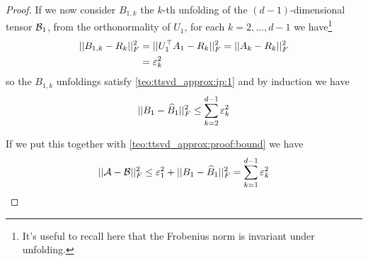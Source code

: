 \begin{Teo}
\begin{proof}
    If we now consider $B_{1,k}$ the $k$-th unfolding of the $(d-1)$-dimensional tensor $\mathcal{B}_1$, from the orthonormality of $U_1$, for each $k=2,\ldots,d-1$ we have\footnote{It's useful to recall here that the Frobenius norm is invariant under unfolding.}
    \begin{equation*}
      \begin{split}
        ||B_{1,k} - R_k||_F^2 &= ||U_1^\top A_1 - R_k||_F^2 = ||A_k - R_k||_F^2\\
         &= \varepsilon_k^2
      \end{split}
    \end{equation*}
    so the $B_{1,k}$ unfoldings satisfy \ref{teo:ttsvd_approx:ip:1} and by induction we have
    \begin{equation*}
      ||B_1 - \widehat{B}_1 ||_F^2 \le \sum_{k=2}^{d-1} \varepsilon_k^2
    \end{equation*}

    If we put this together with \ref{teo:ttsvd_approx:proof:bound} we have
    \begin{equation*}
      ||\mathcal{A} - \mathcal{B}||_F^2 \le \varepsilon_1^2 + ||B_1 - \widehat{B}_1 ||_F^2 = \sum_{k=1}^{d-1} \varepsilon_k^2
    \end{equation*}
  \end{proof}
\end{Teo}

